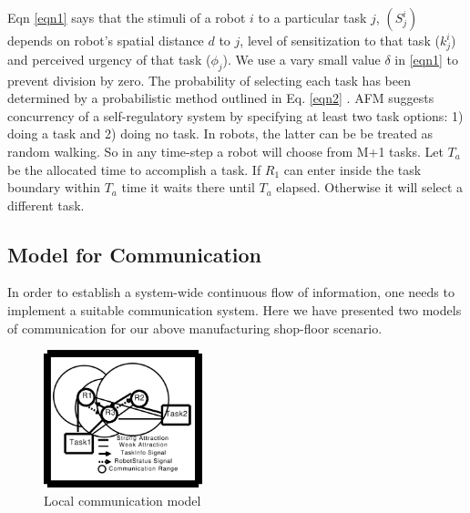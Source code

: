 \documentclass[letterpaper, 10 pt, conference]{ieeeconf}  %
\begin{document}
Eqn \ref{eqn1} says that the stimuli of a robot $i$ to a particular task $j$, $(S_{j}^{i})$ depends on robot's spatial distance $d$ to $j$, level of sensitization to that task ($k_{j}^{i}$) and perceived urgency of that task ($\phi _{j}$). We use a vary small value $\delta$ in \ref{eqn1} to prevent  division by zero. The probability of selecting each task has been determined by a probabilistic method outlined in Eq. \ref{eqn2} . 
AFM suggests concurrency of a self-regulatory system by specifying at least two task options: 1) doing a task and 2) doing no task. In robots, the latter can be   be treated as random walking. So in any time-step a robot will choose from M+1 tasks. Let $T_a$ be the allocated time to accomplish a task. If $R_1$ can enter inside the task boundary within $T_a$ time it waits there until $T_a$ elapsed. Otherwise it will select a different task. 

\subsection{Model for Communication}
In order to establish a system-wide continuous flow of information, one needs to implement a  suitable communication system. Here we have presented two models of communication for our above manufacturing shop-floor scenario.
%
\begin{figure}[thpb]
\centering
\includegraphics[height=4cm, angle=0]{../dia-files/LocalComm.eps}
\caption{Local communication model}
\label{fig:lcm} %
\end{figure}
%
\end{document}
